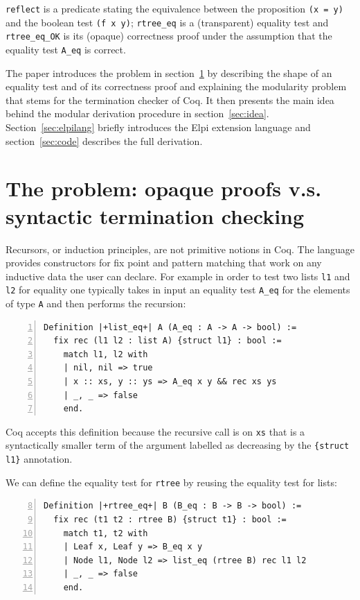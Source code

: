 \documentclass[a4paper,UKenglish,cleveref, autoref]{lipics-v2019}
\begin{document}
\noindent
\lstinline+reflect+
is a predicate stating the equivalence between the
proposition \lstinline+(x = y)+
and the boolean test \lstinline+(f x y)+;
\lstinline+rtree_eq+ is a (transparent) equality test and
\lstinline+rtree_eq_OK+ is its (opaque) correctness proof
under the assumption that the equality test \lstinline+A_eq+ is correct.

The paper introduces the problem in
section~\ref{sec:problem} by describing the shape of an equality test
and of its correctness proof and explaining the modularity problem
that stems for the termination checker of Coq. It then
presents the main idea behind the
modular derivation procedure in section~\ref{sec:idea}.
Section~\ref{sec:elpilang} briefly introduces the Elpi extension language
and section~\ref{sec:code} describes the full 
derivation.


\section{The problem: opaque proofs v.s. syntactic termination checking} %
\label{sec:problem}

Recursors, or induction principles, are not primitive notions in Coq.
The language provides constructors for fix point and pattern matching
that work on any inductive data the user can declare.
For example in order to test two lists \lstinline+l1+ and \lstinline+l2+ for
equality one typically takes in input an equality test \lstinline+A_eq+
for the elements of type \lstinline+A+ and then performs the
recursion:
\begin{lstlisting}[numbers=left]
Definition |+list_eq+| A (A_eq : A -> A -> bool) :=
  fix rec (l1 l2 : list A) {struct l1} : bool :=
    match l1, l2 with
    | nil, nil => true
    | x :: xs, y :: ys => A_eq x y && rec xs ys
    | _, _ => false
    end.
\end{lstlisting}

\noindent
Coq accepts this definition because
the recursive call is on \lstinline+xs+ that is a syntactically
smaller term of the argument
labelled as decreasing by the \lstinline+{struct l1}+
annotation.

We can define the equality test for \lstinline+rtree+
by reusing the equality test for lists:
\begin{lstlisting}[numbers=left,firstnumber=8]
Definition |+rtree_eq+| B (B_eq : B -> B -> bool) :=
  fix rec (t1 t2 : rtree B) {struct t1} : bool :=
    match t1, t2 with
    | Leaf x, Leaf y => B_eq x y
    | Node l1, Node l2 => list_eq (rtree B) rec l1 l2
    | _, _ => false
    end.
\end{lstlisting}
\end{document}
